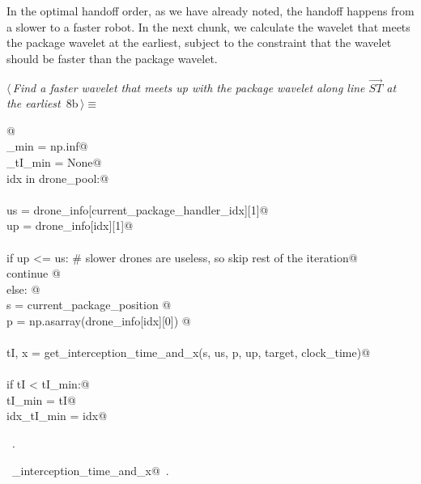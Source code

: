 \documentclass[10pt, english, oneside]{report}
\begin{document}
In the optimal handoff order, as we have already noted, the handoff happens from a slower to a faster robot. 
In the next chunk, we calculate the wavelet that meets the package wavelet at the earliest, subject to the 
constraint that the wavelet should be faster than the package wavelet. 


\begin{flushleft} \small
\begin{minipage}{\linewidth}\label{scrap5}\raggedright\small
{} $\langle\,${\itshape Find a faster wavelet that meets up with the package wavelet along line $\vec{ST}$ at the earliest}\nobreak\ {\footnotesize {8b}}$\,\rangle\equiv$
\vspace{-1ex}
\begin{list}{}{} \item
\mbox{}\verb@   @\\
\mbox{}\verb@tI_min     = np.inf@\\
\mbox{}\verb@idx_tI_min = None@\\
\mbox{}\verb@for idx in drone_pool:@\\
\mbox{}\verb@@\\
\mbox{}\verb@      us = drone_info[current_package_handler_idx][1]@\\
\mbox{}\verb@      up = drone_info[idx][1]@\\
\mbox{}\verb@@\\
\mbox{}\verb@      if up <= us: # slower drones are useless, so skip rest of the iteration@\\
\mbox{}\verb@          continue @\\
\mbox{}\verb@      else: @\\
\mbox{}\verb@        s = current_package_position @\\
\mbox{}\verb@        p = np.asarray(drone_info[idx][0]) @\\
\mbox{}\verb@@\\
\mbox{}\verb@        tI, x = get_interception_time_and_x(s, us, p, up, target, clock_time)@\\
\mbox{}\verb@@\\
\mbox{}\verb@        if tI < tI_min:@\\
\mbox{}\verb@           tI_min     = tI@\\
\mbox{}\verb@           idx_tI_min = idx@\\
\mbox{}\verb@@{\NWsep}
\end{list}
\vspace{-1.5ex}
\footnotesize
\begin{list}{}{\setlength{\itemsep}{-\parsep}\setlength{\itemindent}{-\leftmargin}}
\item \NWtxtMacroRefIn\ .
\item \NWtxtIdentsUsed\nobreak\  \verb@get_interception_time_and_x@\nobreak\ .
\item{}
\end{list}
\end{minipage}\vspace{4ex}
\end{flushleft}
\end{document}
